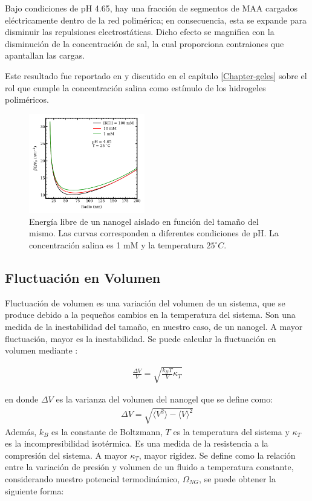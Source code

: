 	Bajo condiciones de pH 4.65, hay una fracci\'on de segmentos de MAA cargados el\'ectricamente dentro de la red polim\'erica; en consecuencia, esta se expande para disminuir las repulsiones electrost\'aticas. Dicho efecto se magnifica con la disminuci\'on de la concentraci\'on de sal, la cual proporciona contraiones que apantallan las cargas.
	
	Este resultado fue reportado en \cite{perez2021thermodynamic} y discutido en el cap\'itulo \ref{Chapter-geles} sobre el rol que cumple la concentraci\'on salina como est\'imulo de los hidrogeles polim\'ericos.
	
	
	\begin{figure}[!htb]
		\centering
		\includegraphics[width=0.45\textwidth]{Figures/graph-mc/interna.png}
		\caption{Energ\'ia libre de un nanogel aislado en funci\'on del tama\~no del mismo. Las curvas corresponden a diferentes condiciones de pH. La concentraci\'on salina es 1 mM y la temperatura $25 ^\circ C$.}
		\label{fig:mc:energy-intra}
	\end{figure}
	
	
	\subsection{Fluctuaci\'on en Volumen}\label{sec:mc:fluctuacion}
	
	Fluctuaci\'on de volumen es una variaci\'on del volumen de un sistema, que se produce debido a la peque\~nos cambios en la temperatura del sistema. Son una medida de la inestabilidad del tama\~no, en nuestro caso, de un nanogel. A mayor fluctuaci\'on, mayor es la inestabilidad.
	Se puede calcular la fluctuaci\'on en volumen mediante \cite{callen1991thermodynamics}:
	
	\begin{align}
		\frac{\Delta V}{V} = \sqrt{\frac{k_BT}{V}\kappa_T}
	\end{align}
	
	\noindent en donde $\Delta V$ es la varianza del volumen del nanogel que se define como:
	\begin{align}
		\Delta V = \sqrt{\langle V^2\rangle - \langle V \rangle^2}
	\end{align}
	Adem\'as, $k_B$ es la constante de Boltzmann, $T$ es la temperatura del sistema y $\kappa_T$ es la incompresibilidad isot\'ermica. Es una medida de la resistencia a la compresi\'on del sistema. A mayor $\kappa_T$, mayor rigidez.
	Se define como la relación entre la variaci\'on de presi\'on y  volumen de un fluido a temperatura constante, considerando nuestro potencial termodin\'amico, $\Omega_{NG}$, se puede obtener la siguiente forma:
	
